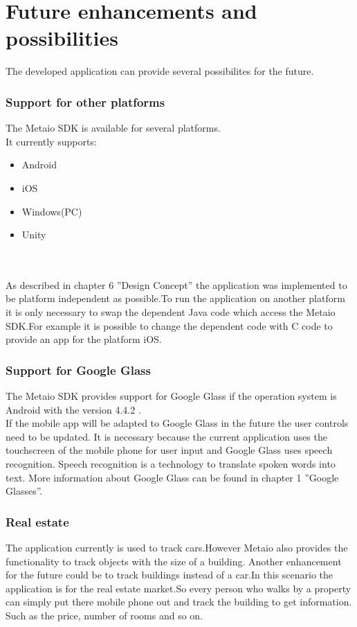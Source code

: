\chapter{Future enhancements and possibilities} \label{chapter:Future enhancement and possibilities}

The developed application can provide several possibilites for the future.
\subsection{Support for other platforms}
The Metaio SDK is available for several platforms.  \\It currently supports:
\begin{itemize}
\item Android
\item iOS
\item Windows(PC)
\item Unity
\end{itemize}
 \cite{metaioPlatforms} 
        \\
        \\
As described in chapter 6 ''Design Concept'' the application was implemented to be platform independent as possible.To run the application on another platform it is only necessary to swap the dependent Java code which access the Metaio SDK.For example it is possible to change the dependent code with C code to provide an app for the platform iOS. 


\newpage
\subsection{Support for Google Glass}
The Metaio SDK provides support for Google Glass if the operation system is Android with the version 4.4.2 .\cite{metaioGlass}\\
If the mobile app will be adapted to Google Glass in the future the user controls need to be updated. It is necessary because the current application  uses the touchscreen of the mobile phone  for user input and Google Glass uses speech recognition. Speech recognition is a technology to translate spoken words into text.    
More information about Google Glass can be found in  chapter 1 ''Google Glasses''.   
\subsection{Real estate}
The application currently is used to track cars.However Metaio also provides the functionality to track objects with the size of a building. Another enhancement for the future could be to track buildings instead of a car.In this scenario the application is for the real estate market.So every person who walks by a property can simply put there mobile phone out and track the building to get information. Such as the price, number of rooms and so on.    
  
\newpage